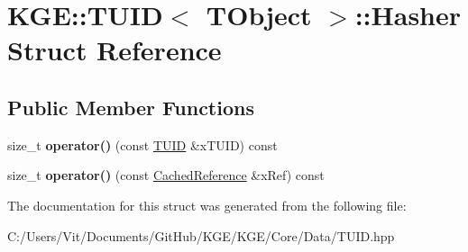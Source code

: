 \hypertarget{struct_k_g_e_1_1_t_u_i_d_1_1_hasher}{\section{K\-G\-E\-:\-:T\-U\-I\-D$<$ T\-Object $>$\-:\-:Hasher Struct Reference}
\label{struct_k_g_e_1_1_t_u_i_d_1_1_hasher}
}
\subsection*{Public Member Functions}
\begin{DoxyCompactItemize}
\item 
\hypertarget{struct_k_g_e_1_1_t_u_i_d_1_1_hasher_a1a28d72d36035f69c034515919c58c95}{size\-\_\-t {\bfseries operator()} (const \hyperlink{class_k_g_e_1_1_t_u_i_d}{T\-U\-I\-D} \&x\-T\-U\-I\-D) const }\label{struct_k_g_e_1_1_t_u_i_d_1_1_hasher_a1a28d72d36035f69c034515919c58c95}

\item 
\hypertarget{struct_k_g_e_1_1_t_u_i_d_1_1_hasher_a0601d06152fcc63a3082f3e173fd8a8f}{size\-\_\-t {\bfseries operator()} (const \hyperlink{class_k_g_e_1_1_t_u_i_d_1_1_cached_reference}{Cached\-Reference} \&x\-Ref) const }\label{struct_k_g_e_1_1_t_u_i_d_1_1_hasher_a0601d06152fcc63a3082f3e173fd8a8f}

\end{DoxyCompactItemize}


The documentation for this struct was generated from the following file\-:\begin{DoxyCompactItemize}
\item 
C\-:/\-Users/\-Vit/\-Documents/\-Git\-Hub/\-K\-G\-E/\-K\-G\-E/\-Core/\-Data/T\-U\-I\-D.\-hpp\end{DoxyCompactItemize}
